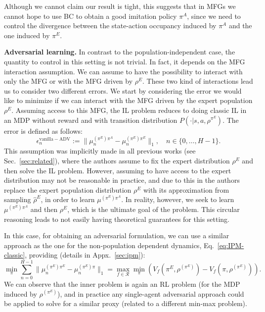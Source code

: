 \documentclass{article}
\begin{document}
Although we cannot claim our result is tight, this suggests that in MFGs we cannot hope to use BC to obtain a good imitation policy $\pi^A$, since we need to control the divergence between the state-action occupancy induced by $\pi^A$ and the one induced by $\pi^E$. 

\textbf{Adversarial learning.}
In contrast to the population-independent case, the quantity to control in this setting is not trivial.
In fact, it depends on the MFG interaction assumption. We can assume to have the possibility to interact with only the MFG or with the MFG driven by $\rho^E$. These two kind of interactions lead us to consider two different errors. 
We start by considering the error we would like to minimize if we can interact with the MFG driven by the expert population $\rho^E$. Assuming access to this MFG, the IL problem reduces to doing classic IL in an MDP without reward and with transition distribution $P(\cdot|s,a,\rho^{\pi^E})$. The error is defined as follows:
\begin{equation}
\epsilon_n^{\mathrm{vanilla-ADV}} := \|\mu_n^{(\pi^E)\pi^A}-\mu_n^{(\pi^E)\pi^E}\|_1, \quad n\in\{0,\dots,H-1\}.
\end{equation}
This assumption was implicitly made in all previous works  (see Sec.~\ref{sec:related}), where the authors assume to fix the expert distribution $\rho^E$ and then solve the IL problem. 
However, assuming to have access to the expert distribution may not be 
reasonable in practice, and due to this in \cite{chen2021adversarial, chen2022individual} the authors replace the expert population distribution $\rho^E$ with its approximation from sampling $\hat{\rho}^E$, in order to learn $\mu^{(\pi^E)\pi^A}$. 
In reality, however, we seek to learn $\mu^{(\pi^E)\pi^A}$ and then $\rho^E$, which is the ultimate goal of the problem. 
This circular reasoning leads to not easily having theoretical guarantees for this setting. 

In this case, for obtaining an adversarial formulation, we can use a similar approach as the one for the non-population dependent dynamics, Eq.~\eqref{eq:IPM-classic}, providing (details in Appx.~\ref{sec:ipm}):
\begin{equation}
    \min_\pi \sum_{n=0}^{H-1}\|\mu_n^{(\pi^E)\pi^{E}} - \mu_n^{(\pi^E)\pi}\|_1 = \max_{f\in\mathcal{R}} \min_\pi (V_f(\pi^E, \rho^{(\pi^E)}) - V_f(\pi, \rho^{(\pi^E)})).
\end{equation}
We can observe that the inner problem is again an RL problem (for the MDP induced by $\rho^{(\pi^E)}$), and in practice any single-agent adversarial approach could be applied to solve for a similar proxy (related to a different min-max problem).
\end{document}
